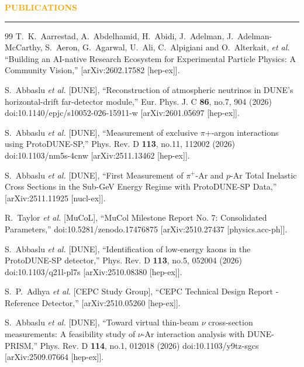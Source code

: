 \documentclass{resume} %
\renewenvironment{rSection}[1]{
\sectionskip
\textcolor{Orange}{\bfseries\MakeUppercase{#1}}
\sectionlineskip
\hrule
\begin{list}{}{
\setlength{\leftmargin}{1.5em}
}
\item[]
}{
\end{list}
}
\begin{document}
\begin{rSection}{ Publications}
\begin{thebibliography}{99}
T.~K.~Aarrestad, A.~Abdelhamid, H.~Abidi, J.~Adelman, J.~Adelman-McCarthy, S.~Aeron, G.~Agarwal, U.~Ali, C.~Alpigiani and O.~Alterkait, \textit{et al.}
``Building an AI-native Research Ecosystem for Experimental Particle Physics: A Community Vision,''
[arXiv:2602.17582 [hep-ex]].

S.~Abbaslu \textit{et al.} [DUNE],
``Reconstruction of atmospheric neutrinos in DUNE{\textquoteright}s horizontal-drift far-detector module,''
Eur. Phys. J. C \textbf{86}, no.7, 904 (2026)
doi:10.1140/epjc/s10052-026-15911-w
[arXiv:2601.05697 [hep-ex]].

S.~Abbaslu \textit{et al.} [DUNE],
``Measurement of exclusive {\ensuremath{\pi}}+-argon interactions using ProtoDUNE-SP,''
Phys. Rev. D \textbf{113}, no.11, 112002 (2026)
doi:10.1103/nm5s-4cnw
[arXiv:2511.13462 [hep-ex]].

S.~Abbaslu \textit{et al.} [DUNE],
``First Measurement of $π^+$-Ar and $p$-Ar Total Inelastic Cross Sections in the Sub-GeV Energy Regime with ProtoDUNE-SP Data,''
[arXiv:2511.11925 [nucl-ex]].

R.~Taylor \textit{et al.} [MuCoL],
``MuCol Milestone Report No. 7: Consolidated Parameters,''
doi:10.5281/zenodo.17476875
[arXiv:2510.27437 [physics.acc-ph]].

S.~Abbaslu \textit{et al.} [DUNE],
``Identification of low-energy kaons in the ProtoDUNE-SP detector,''
Phys. Rev. D \textbf{113}, no.5, 052004 (2026)
doi:10.1103/q21l-pl7s
[arXiv:2510.08380 [hep-ex]].

S.~P.~Adhya \textit{et al.} [CEPC Study Group],
``CEPC Technical Design Report - Reference Detector,''
[arXiv:2510.05260 [hep-ex]].

S.~Abbaslu \textit{et al.} [DUNE],
``Toward virtual thin-beam \(\nu\) cross-section measurements: A feasibility study of \(\nu\)-Ar interaction analysis with DUNE-PRISM,''
Phys. Rev. D \textbf{114}, no.1, 012018 (2026)
doi:10.1103/y9tz-sgcs
[arXiv:2509.07664 [hep-ex]].


\end{thebibliography}
\end{rSection}
\end{document}
